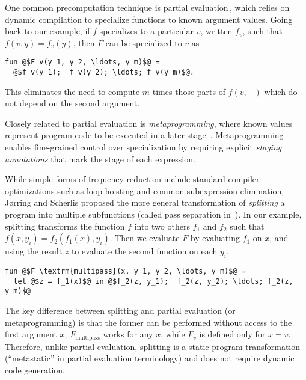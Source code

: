 One common precomputation technique is partial
evaluation\,\cite{futamura71,jones96}, which relies on dynamic
compilation to specialize functions to known argument values. Going
back to our example, if $f$ specializes to a particular $v$, written
$f_v$, such that $f(v,y) = f_v(y)$, then $F$ can be specialized to $v$
as
\begin{lstlisting}
fun @$F_v(y_1, y_2, \ldots, y_m)$@ = 
  @$f_v(y_1);  f_v(y_2); \ldots; f_v(y_m)$@.
\end{lstlisting}
This eliminates the need to compute $m$ times those parts of $f(v,-)$
which do not depend on the second argument.

Closely related to partial evaluation is {\em metaprogramming}, where
known values represent program code to be executed in a later stage
\,\cite{davies96,Taha97,DP01-modal,NP05-nn}. Metaprogramming enables
fine-grained control over specialization by requiring explicit
\emph{staging annotations} that mark the stage of each expression.




While simple forms of frequency reduction include standard compiler
optimizations such as loop hoisting and common subexpression
elimination, J{\o}rring and Scherlis proposed the more general
transformation of {\em splitting} a program into multiple subfunctions
(called pass separation in \,\cite{JS86-staging}). In our example,
splitting transforms the function $f$ into two others $f_1$ and $f_2$
such that $f(x,y_i) = f_2(f_1(x),y_i)$. Then we evaluate $F$ by
evaluating $f_1$ on $x$, and using the result $z$ to evaluate
the second function on each $y_i$.
%
\begin{lstlisting}
fun @$F_\textrm{multipass}(x, y_1, y_2, \ldots, y_m)$@ = 
  let @$z = f_1(x)$@ in @$f_2(z, y_1);  f_2(z, y_2); \ldots; f_2(z, y_m)$@
\end{lstlisting}
%
The key difference between splitting and partial evaluation (or
metaprogramming) is that the former can be performed without access to
the first argument $x$; $F_\textrm{multipass}$ works for any $x$,
while $F_v$ is defined only for $x=v$.  Therefore, unlike partial
evaluation, splitting is a static program transformation
(``metastatic'' in partial evaluation terminology) and does not require
dynamic code generation.

